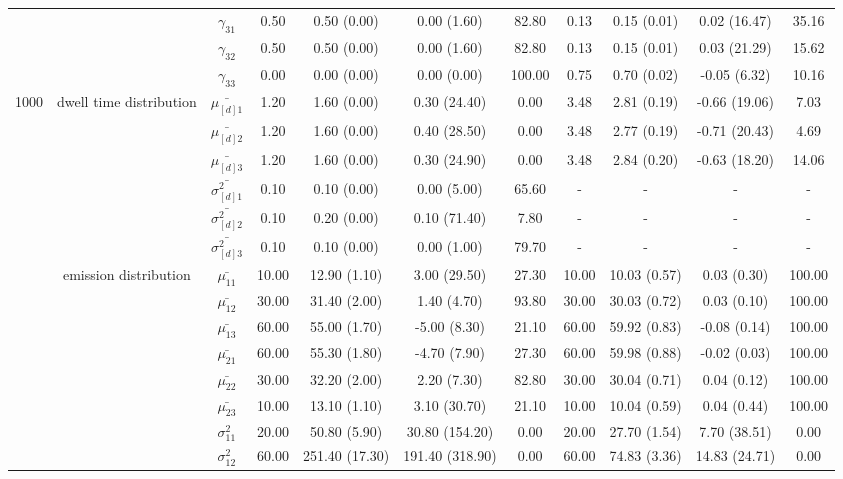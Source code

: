 \begin{table}[h]
{\begin{tabular}{ccccccccccc}
 &  & $\gamma_{31}$ & 0.50 & 0.50 (0.00) & 0.00 (1.60) & 82.80 & 0.13 & 0.15 (0.01) & 0.02 (16.47) & 35.16 \\
 &  & $\gamma_{32}$ & 0.50 & 0.50 (0.00) & 0.00 (1.60) & 82.80 & 0.13 & 0.15 (0.01) & 0.03 (21.29) & 15.62 \\
 &  & $\gamma_{33}$ & 0.00 & 0.00 (0.00) & 0.00 (0.00) & 100.00 & 0.75 & 0.70 (0.02) & -0.05 (6.32) & 10.16 \\ \midrule
1000 & dwell time distribution & $\bar{\mu_{[d]1}}$ & 1.20 & 1.60 (0.00) & 0.30 (24.40) & 0.00 & 3.48 & 2.81 (0.19) & -0.66 (19.06) & 7.03 \\
\multirow{26}{*}{} & \multirow{5}{*}{} & $\bar{\mu_{[d]2}}$ & 1.20 & 1.60 (0.00) & 0.40 (28.50) & 0.00 & 3.48 & 2.77 (0.19) & -0.71 (20.43) & 4.69 \\
 &  & $\bar{\mu_{[d]3}}$ & 1.20 & 1.60 (0.00) & 0.30 (24.90) & 0.00 & 3.48 & 2.84 (0.20) & -0.63 (18.20) & 14.06 \\
 &  & $\bar{\sigma^2_{[d]1}}$ & 0.10 & 0.10 (0.00) & 0.00 (5.00) & 65.60 & - & - & - & - \\
 &  & $\bar{\sigma^2_{[d]2}}$ & 0.10 & 0.20 (0.00) & 0.10 (71.40) & 7.80 & - & - & - & - \\
 &  & $\bar{\sigma^2_{[d]3}}$ & 0.10 & 0.10 (0.00) & 0.00 (1.00) & 79.70 & - & - & - & - \\
 & emission distribution & $\bar{\mu_{11}}$ & 10.00 & 12.90 (1.10) & 3.00 (29.50) & 27.30 & 10.00 & 10.03 (0.57) & 0.03 (0.30) & 100.00 \\
 & \multirow{11}{*}{} & $\bar{\mu_{12}}$ & 30.00 & 31.40 (2.00) & 1.40 (4.70) & 93.80 & 30.00 & 30.03 (0.72) & 0.03 (0.10) & 100.00 \\
 &  & $\bar{\mu_{13}}$ & 60.00 & 55.00 (1.70) & -5.00 (8.30) & 21.10 & 60.00 & 59.92 (0.83) & -0.08 (0.14) & 100.00 \\
 &  & $\bar{\mu_{21}}$ & 60.00 & 55.30 (1.80) & -4.70 (7.90) & 27.30 & 60.00 & 59.98 (0.88) & -0.02 (0.03) & 100.00 \\
 &  & $\bar{\mu_{22}}$ & 30.00 & 32.20 (2.00) & 2.20 (7.30) & 82.80 & 30.00 & 30.04 (0.71) & 0.04 (0.12) & 100.00 \\
 &  & $\bar{\mu_{23}}$ & 10.00 & 13.10 (1.10) & 3.10 (30.70) & 21.10 & 10.00 & 10.04 (0.59) & 0.04 (0.44) & 100.00 \\
 &  & $\sigma^2_{11}$ & 20.00 & 50.80 (5.90) & 30.80 (154.20) & 0.00 & 20.00 & 27.70 (1.54) & 7.70 (38.51) & 0.00 \\
 &  & $\sigma^2_{12}$ & 60.00 & 251.40 (17.30) & 191.40 (318.90) & 0.00 & 60.00 & 74.83 (3.36) & 14.83 (24.71) & 0.00 \\

\end{tabular}}
\end{table}
